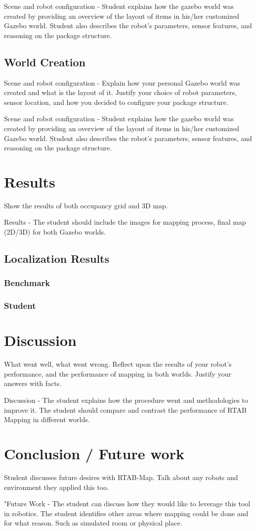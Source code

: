 \documentclass[10pt,journal,compsoc]{IEEEtran}
\begin{document}
Scene and robot configuration - Student explains how the gazebo world was created by providing an overview of the layout of items in his/her customized Gazebo world. Student also describes the robot's parameters, sensor features, and reasoning on the package structure.

\subsection{World Creation}
Scene and robot configuration - Explain how your personal Gazebo world was created and what is the layout of it. Justify your choice of robot parameters, sensor location, and how you decided to configure your package structure.

Scene and robot configuration - Student explains how the gazebo world was created by providing an overview of the layout of items in his/her customized Gazebo world. Student also describes the robot's parameters, sensor features, and reasoning on the package structure.

\section{Results}
Show the results of both occupancy grid and 3D map.

Results - The student should include the images for mapping process, final map (2D/3D) for both Gazebo worlds.

\subsection{Localization Results}
\subsubsection{Benchmark}
\subsubsection{Student}

\section{Discussion}
What went well, what went wrong. Reflect upon the results of your robot's performance, and the performance of mapping in both worlds. Justify your answers with facts.

Discussion - The student explains how the procedure went and methodologies to improve it. The student should compare and contrast the performance of RTAB Mapping in different worlds.

\section{Conclusion / Future work}
Student discusses future desires with RTAB-Map. Talk about any robots and environment they applied this too.

"Future Work - The student can discuss how they would like to leverage this tool in robotics. The student identifies other areas where mapping could be done and for what reason. Such as simulated room or physical place.



\end{document}
